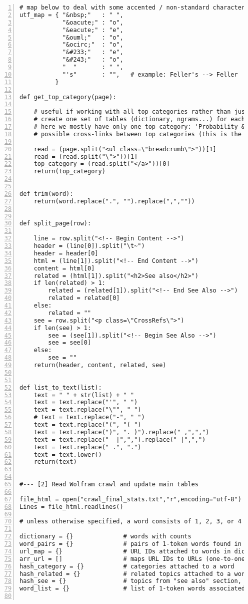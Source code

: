 \documentclass[oneside,10pt]{book}
\begin{document}
\begin{lstlisting}[numbers=left]
# map below to deal with some accented / non-standard characters
utf_map = { "&nbsp;"   : " ", 
            "&oacute;" : "o",
            "&eacute;" : "e",
            "&ouml;"   : "o",
            "&ocirc;"  : "o",
            "&#233;"   : "e",
            "&#243;"   : "o",
            "  "       : " ",
            "'s"       : "",   # example: Feller's --> Feller
          }

def get_top_category(page):

    # useful if working with all top categories rather than just one 
    # create one set of tables (dictionary, ngrams...) for each top category
    # here we mostly have only one top category: 'Probability & Statistics'
    # possible cross-links between top categories (this is the case here)

    read = (page.split("<ul class=\"breadcrumb\">"))[1]
    read = (read.split("\">"))[1]
    top_category = (read.split("</a>"))[0]
    return(top_category)


def trim(word):
    return(word.replace(".", "").replace(",",""))


def split_page(row):

    line = row.split("<!-- Begin Content -->")  
    header = (line[0]).split("\t~")
    header = header[0]
    html = (line[1]).split("<!-- End Content -->")
    content = html[0] 
    related = (html[1]).split("<h2>See also</h2>")
    if len(related) > 1:
        related = (related[1]).split("<!-- End See Also -->")
        related = related[0]
    else:
        related = ""
    see = row.split("<p class=\"CrossRefs\">")
    if len(see) > 1:
        see = (see[1]).split("<!-- Begin See Also -->")
        see = see[0]
    else:
        see = ""
    return(header, content, related, see) 


def list_to_text(list):
    text = " " + str(list) + " "
    text = text.replace("'", " ")
    text = text.replace("\"", " ")
    # text = text.replace("-", " ")   
    text = text.replace("(", "( ")
    text = text.replace(")", ". )").replace(" ,",",")
    text = text.replace("  |",",").replace(" |",",")
    text = text.replace(" .", ".")
    text = text.lower()
    return(text)


#--- [2] Read Wolfram crawl and update main tables

file_html = open("crawl_final_stats.txt","r",encoding="utf-8")
Lines = file_html.readlines() 

# unless otherwise specified, a word consists of 1, 2, 3, or 4 tokens

dictionary = {}              # words with counts
word_pairs = {}              # pairs of 1-token words found in same word, with count
url_map = {}                 # URL IDs attached to words in dictionary
arr_url = []                 # maps URL IDs to URLs (one-to-one)
hash_category = {}           # categories attached to a word
hash_related = {}            # related topics attached to a word
hash_see = {}                # topics from "see also" section, attached to a word
word_list = {}               # list of 1-token words associated to a 1-token word 


\end{lstlisting}
\end{document}
